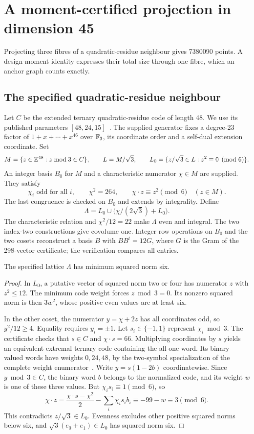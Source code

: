 \section{A moment-certified projection in dimension 45}\label{sec:projection45}
Projecting three fibres of a quadratic-residue neighbour gives 7380090
points. A design-moment identity expresses their total size through one
fibre, which an anchor graph counts exactly.

\subsection{The specified quadratic-residue neighbour}\label{sec:qr-neighbour}
Let $C$ be the extended ternary quadratic-residue code of length 48.
We use its published parameters $[48,24,15]$~\cite{leech-sloane1971,nebe}.
The supplied generator fixes a degree-23 factor of
$1+x+\cdots+x^{46}$ over $\mathbb F_3$, its coordinate order and a self-dual
extension coordinate.
Set
\[
M=\{z\in\mathbb Z^{48}:z\bmod3\in C\},\qquad L=M/\sqrt3,
\qquad L_0=\{z/\sqrt3\in L:z^2\equiv0\pmod6\}.
\]
An integer basis $B_0$ for $M$ and a characteristic numerator
$\chi\in M$ are supplied. They satisfy
\[
\chi_i\text{ odd for all }i,\qquad
\chi^2=264,\qquad
\chi\cdot z\equiv z^2\pmod6\quad(z\in M).
\]
The last congruence is checked on $B_0$ and extends by integrality.
Define
\[
\Lambda=L_0\cup\bigl(\chi/(2\sqrt3)+L_0\bigr).
\]
The characteristic relation and $\chi^2/12=22$ make $\Lambda$ even
and integral. The two index-two constructions give covolume one.
Integer row operations on $B_0$ and the two cosets reconstruct a basis
$B$ with $BB^t=12G$, where $G$ is the Gram of the 298-vector certificate;
the verification compares all entries.

\begin{lemma}\label{lem:qr-minimum}
The specified lattice $\Lambda$ has minimum squared norm six.
\end{lemma}
\begin{proof}
In $L_0$, a putative vector of squared norm two or four has numerator
$z$ with $z^2\le12$. The minimum code weight forces $z\bmod3=0$.
Its nonzero squared norm is then $3w^2$, whose positive even values
are at least six.

In the other coset, the numerator $y=\chi+2z$ has all coordinates
odd, so $y^2/12\ge4$. Equality requires $y_i=\pm1$.
Let $s_i\in\{-1,1\}$ represent $\chi_i\bmod3$. The certificate
checks that $s\in C$ and $\chi\cdot s=66$. Multiplying coordinates
by $s$ yields an equivalent extremal ternary code containing the
all-one word. Its binary-valued words have weights $0,24,48$, by
the two-symbol specialization of the complete weight
enumerator~\cite[equation (20)]{munemasa-tamura}.
Write $y=s(1-2b)$ coordinatewise. Since $y\bmod3\in C$, the
binary word $b$ belongs to the normalized code, and its weight $w$
is one of these three values. But $\chi_i s_i\equiv1\pmod6$,
so
\[
\chi\cdot z
=\frac{\chi\cdot s-\chi^2}{2}-\sum_i\chi_i s_i b_i
\equiv-99-w\equiv3\pmod6.
\]
This contradicts $z/\sqrt3\in L_0$. Evenness excludes other
positive squared norms below six, and $\sqrt3(e_0+e_1)\in L_0$ has
squared norm six.
\end{proof}

